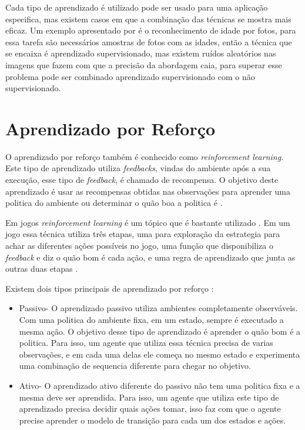 Cada tipo de aprendizado é utilizado pode ser usado para uma aplicação especifica, mas existem casos em que a combinação das técnicas se mostra mais eficaz. Um exemplo apresentado por \cite{intelligence2003modern} é o reconhecimento de idade por fotos, para essa tarefa são necessários amostras de fotos com as idades, então a técnica que se encaixa é aprendizado supervisionado, mas existem ruídos aleatórios nas imagens que fazem com que a precisão da abordagem caia, para superar esse problema pode ser combinado aprendizado supervisionado com o não supervisionado.

\section{Aprendizado por Reforço}

O aprendizado por reforço também é conhecido como \textit{reinforcement learning}. Este tipo de aprendizado utiliza \textit{feedbacks}, vindas do ambiente após a sua execução, esse tipo de \textit{feedback}, é chamado de recompensa. O objetivo deste aprendizado é usar as recompensas obtidas nas observações para aprender uma politica do ambiente ou determinar o quão boa a politica é \cite{intelligence2003modern}. 

Em jogos \textit{reinforcement learning} é um tópico que é bastante utilizado \cite{millington2009artificial}. Em um jogo essa técnica utiliza três etapas, uma para exploração da estrategia para achar as diferentes ações possíveis no jogo, uma função que disponibiliza o \textit{feedback} e diz o quão bom é cada ação, e uma regra de aprendizado que junta as outras duas etapas \cite{millington2009artificial}.

Existem dois tipos principais de aprendizado por reforço \cite{intelligence2003modern}:

\begin{itemize}
	\item Passivo- O aprendizado passivo utiliza ambientes completamente observáveis. Com uma politica do ambiente fixa, em um estado, sempre é executado a mesma ação. O objetivo desse tipo de aprendizado é aprender o quão bom é a politica. Para isso, um agente que utiliza essa técnica precisa de varias observações, e em cada uma delas ele começa no mesmo estado e experimenta uma combinação de sequencia diferente para chegar no objetivo.
	\item Ativo- O aprendizado ativo diferente do passivo não tem uma politica fixa e a mesma deve ser aprendida. Para isso, um agente que utiliza este tipo de aprendizado precisa decidir quais ações tomar, isso faz com que o agente precise aprender o modelo de transição para cada um dos estados e ações.
\end{itemize}

